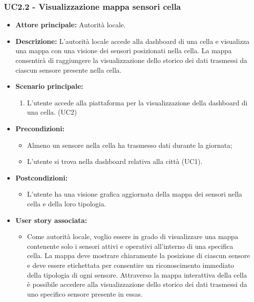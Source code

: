 \subsubsection{UC2.2 - Visualizzazione mappa sensori cella}
\begin{itemize}
    \item \textbf{Attore principale:} Autorità locale.
    \item \textbf{Descrizione:} L'autorità locale accede alla dashboard di una cella e visualizza una mappa con una visione dei sensori posizionati nella cella.
    La mappa consentirà di raggiungere la visualizzazione dello storico dei dati trasmessi da ciascun sensore presente nella cella.
    \item \textbf{Scenario principale:}
    \begin{enumerate}
      \item L'utente accede alla piattaforma per la visualizzazione della dashboard di una cella. (UC2)
    \end{enumerate}
\item \textbf{Precondizioni:}
    \begin{itemize}
        \item  Almeno un sensore nella cella ha trasmesso dati durante la giornata;
        \item L'utente si trova nella dashboard relativa alla città (UC1).
    \end{itemize}
    \item \textbf{Postcondizioni:}
          \begin{itemize}
              \item      L'utente ha una visione grafica aggiornata della mappa dei sensori nella cella e della loro tipologia.
          \end{itemize}
    \item \textbf{User story associata:}
          \begin{itemize}
              \item Come autorità locale, voglio essere in grado di visualizzare una mappa contenente solo i sensori attivi e operativi all'interno di una specifica cella. La mappa deve mostrare chiaramente la posizione di ciascun sensore e deve essere etichettata per consentire un riconoscimento immediato della tipologia di ogni sensore.
              Attraverso la mappa interattiva della cella è possibile accedere alla visualizzazione dello storico dei dati trasmessi da uno specifico sensore presente in essas.
          \end{itemize}
\end{itemize}
